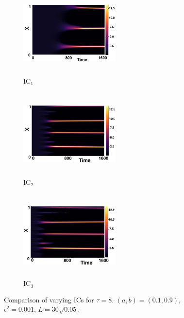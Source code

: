\begin{figure}[H]
    \centering
    \begin{subfigure}[b]{0.32\textwidth}
        \centering
        \includegraphics[width=5cm,height=4.5cm]{gaff8.png}
        \caption{$\text{IC}_1$}
        \label{}
    \end{subfigure}
    \hfill
    \begin{subfigure}[b]{0.32\textwidth}
        \centering
        \includegraphics[width=5cm,height=4.5cm]{ic28.png}
        \caption{$\text{IC}_2$}
        \label{}
    \end{subfigure}
    \hfill
    \begin{subfigure}[b]{0.32\textwidth}
        \centering
        \includegraphics[width=5cm,height=4.5cm]{ic38.png}
        \caption{$\text{IC}_3$}
        \label{}
    \end{subfigure}
    \caption{Comparison of varying ICs for $\tau=8$. $(a,b)=(0.1,0.9)$, $\epsilon^2=0.001$, $L=30\sqrt{0.05}$.}
    \label{fig:figtau8}
\end{figure}

